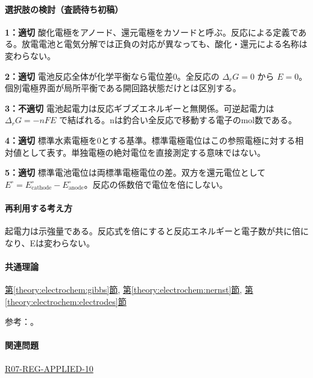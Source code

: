 \paragraph{選択肢の検討（査読待ち初稿）}\mbox{}\par

\noindent\textbf{1：適切} 酸化電極をアノード、還元電極をカソードと呼ぶ。反応による定義である。放電電池と電気分解では正負の対応が異なっても、酸化・還元による名称は変わらない。\par

\noindent\textbf{2：適切} 電池反応全体が化学平衡なら電位差0。全反応の \(\Delta_rG=0\) から \(E=0\)。個別電極界面が局所平衡である開回路状態だけとは区別する。\par

\noindent\textbf{3：不適切} 電池起電力は反応ギブズエネルギーと無関係。可逆起電力は \(\Delta_rG=-nFE\) で結ばれる。nは釣合い全反応で移動する電子のmol数である。\par

\noindent\textbf{4：適切} 標準水素電極を0とする基準。標準電極電位はこの参照電極に対する相対値として表す。単独電極の絶対電位を直接測定する意味ではない。\par

\noindent\textbf{5：適切} 標準電池電位は両標準電極電位の差。双方を還元電位として \(E^\circ=E^\circ_{\mathrm{cathode}}-E^\circ_{\mathrm{anode}}\)。反応の係数倍で電位を倍にしない。\par

\paragraph{再利用する考え方} 起電力は示強量である。反応式を倍にすると反応エネルギーと電子数が共に倍になり、Eは変わらない。

\paragraph{共通理論} \hyperref[theory:electrochem:gibbs]{第\ref*{theory:electrochem:gibbs}節}, \hyperref[theory:electrochem:nernst]{第\ref*{theory:electrochem:nernst}節}, \hyperref[theory:electrochem:electrodes]{第\ref*{theory:electrochem:electrodes}節}

\par 参考：\cite{openstax_cell_gibbs,mit_redox2014}。

\paragraph{関連問題} \hyperref[q:r07-reg-applied-10]{R07-REG-APPLIED-10}

